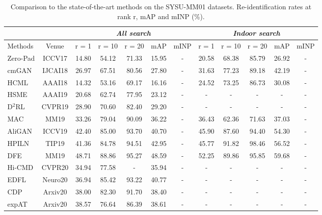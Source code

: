 \documentclass[journal]{IEEEtran}
\begin{document}
\begin{table*}
\caption{Comparison to the state-of-the-art methods on the SYSU-MM01 datasets. Re-identification rates at rank r, mAP and mINP (\%).}
\label{tab:sota_sysu}
  \centering
  \begin{tabular}{l|c|c|c|c|c|c||c|c|c|c|c}
    \toprule[2pt]
    \multicolumn{2}{c|}{}  & \multicolumn{5}{c||}{\emph{All search}} & \multicolumn{5}{c}{\emph{Indoor search}} \\ \hline
      Methods & Venue &   r = 1  & r = 10 & r = 20 & mAP & mINP  &  r = 1 &  r = 10 & r = 20 & mAP & mINP     \\ \toprule[1pt]
      Zero-Pad \cite{wu2017rgb}& ICCV17 & 14.80 & 54.12 & 71.33 & 15.95 & - & 20.58 & 68.38 & 85.79 & 26.92 &-  \\
      cmGAN \cite{dai2018cross} & IJCAI18 & 26.97 & 67.51 & 80.56 & 27.80 & - & 31.63 & 77.23 & 89.18 & 42.19 &-  \\
      HCML \cite{ye2018hierarchical} & AAAI18 & 14.32 & 53.16 & 69.17 & 16.16 &- & 24.52 & 73.25 & 86.73 & 30.08 &- \\ \hline
      HSME \cite{hao2019hsme} & AAAI19  & 20.68 & 62.74 & 77.95 & 23.12 &- & - & - & - & - & - \\
      D$^2$RL \cite{wang2019learning1}& CVPR19  & 28.90 & 70.60 & 82.40 & 29.20 &- & - & - & - & - & - \\
      MAC \cite{Ye2019ModalityawareCL} & MM19 & 33.26 & 79.04 & 90.09 & 36.22 &- & 36.43 & 62.36 & 71.63 & 37.03 &- \\
      AliGAN \cite{wang2019rgb} & ICCV19 & 42.40 & 85.00 & 93.70 & 40.70 &- & 45.90 & 87.60 & 94.40 & 54.30 &- \\
      HPILN \cite{zhao2019hpiln} & TIP19 & 41.36 & 84.78 & 94.51 & 42.95 &- & 45.77 & 91.82 & 98.46 & 56.52 &- \\
      DFE \cite{Hao2019DualalignmentFE} &  MM19 & 48.71 & 88.86 & 95.27 & 48.59 &- & 52.25 & 89.86 & 95.85 & 59.68 &-  \\ \hline
      Hi-CMD \cite{choi2020hi} & CVPR20 & 34.94 & 77.58 & - & 35.94 & -  &  - & - & - & - & - \\
      EDFL \cite{liu2020enhancing} & Neuro20 & 36.94 & 85.42 & 93.22 & 40.77 & - &  - & - & - & - & - \\
      CDP \cite{Fan2020CrossSpectrumDP} & Arxiv20 & 38.00 & 82.30 & 91.70 & 38.40 &- &  - & - & - & - & - \\
      expAT \cite{Ye2020BidirectionalEA} & Arxiv20 & 38.57 & 76.64 & 86.39 & 38.61 &- &  - & - & - & - & - \\

\end{tabular}
\end{table*}
\end{document}
